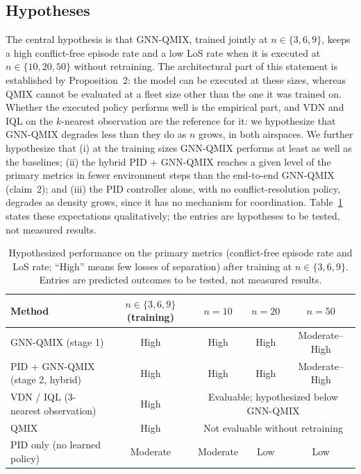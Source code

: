 \subsection{Hypotheses}
\label{subsec:hypotheses}
The central hypothesis is that GNN-QMIX, trained jointly at $n\in\{3,6,9\}$, keeps a high
conflict-free episode rate and a low LoS rate when it is executed at $n\in\{10,20,50\}$
without retraining. The architectural part of this statement is established by
Proposition~2: the model can be executed at these sizes, whereas QMIX cannot be evaluated at
a fleet size other than the one it was trained on. Whether the executed policy performs well
is the empirical part, and VDN and IQL on the $k$-nearest observation are the reference for
it: we hypothesize that GNN-QMIX degrades less than they do as $n$ grows, in both airspaces.
We further hypothesize that (i) at the training sizes GNN-QMIX performs at least as well as
the baselines; (ii) the hybrid PID + GNN-QMIX reaches a given
level of the primary metrics in fewer environment steps than the end-to-end GNN-QMIX
(claim~2); and (iii) the PID controller alone, with no conflict-resolution policy, degrades
as density grows, since it has no mechanism for coordination. Table~\ref{tab:expected}
states these expectations qualitatively; the entries are hypotheses to be tested, not
measured results.

\begin{table}[hbt!]
\caption{\label{tab:expected} Hypothesized performance on the primary metrics
(conflict-free episode rate and LoS rate; ``High'' means few losses of separation) after
training at $n\in\{3,6,9\}$. Entries are predicted outcomes to be tested, not measured
results.}
\centering
\begin{tabular}{lcccc}
\hline
Method & $n\in\{3,6,9\}$ (training) & $n=10$ & $n=20$ & $n=50$ \\
\hline
GNN-QMIX (stage 1) & High & High & High & Moderate--High \\
PID + GNN-QMIX (stage 2, hybrid) & High & High & High & Moderate--High \\
VDN / IQL (3-nearest observation) & High & \multicolumn{3}{c}{Evaluable; hypothesized below GNN-QMIX} \\
QMIX & High & \multicolumn{3}{c}{Not evaluable without retraining} \\
PID only (no learned policy) & Moderate & Moderate & Low & Low \\
\hline
\end{tabular}
\end{table}
